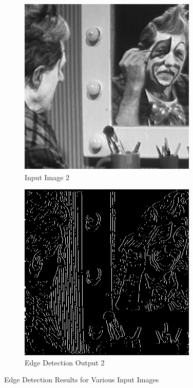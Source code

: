 \documentclass[12pt]{article}
\begin{document}
\begin{figure}[!ht]
	\vspace{0.5cm}

	\begin{subfigure}{0.45\textwidth}
		\includegraphics[width=\textwidth]{../images/joker.png}
		\caption{Input Image 2}
	\end{subfigure}
	\hfill
	\begin{subfigure}{0.45\textwidth}
		\includegraphics[width=\textwidth]{../results/joker.png}
		\caption{Edge Detection Output 2}
	\end{subfigure}

	\caption{Edge Detection Results for Various Input Images}
\end{figure}
\end{document}
